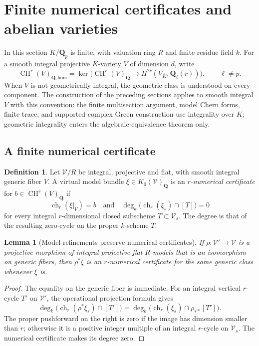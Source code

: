 \documentclass[11pt]{article}
\newtheorem{lemma}[theorem]{Lemma}
\theoremstyle{definition}
\newtheorem{definition}[theorem]{Definition}
\theoremstyle{remark}
\numberwithin{equation}{section}
\newcommand{\CH}{\operatorname{CH}}
\newcommand{\homol}{\mathrm{hom}}
\begin{document}
\section{Finite numerical certificates and abelian varieties}
\label{sec:abelian-numerical}

In this section $K/\mathbf Q_p$ is finite, with valuation ring $R$
and finite residue field $k$.  For a smooth integral projective
$K$-variety $V$ of dimension $d$, write
\[
 \CH^r(V)_{\mathbf Q,\homol}
 =\ker\bigl(\CH^r(V)_{\mathbf Q}\longrightarrow
          H^{2r}(V_{\overline K},\mathbf Q_\ell(r))\bigr),
 \qquad \ell\ne p.
\]
When $V$ is not geometrically integral, the geometric class is
understood on every component.  The construction of the preceding
sections applies to smooth integral $V$ with this convention: the
finite multisection argument, model Chern forms, finite trace, and
supported-complex Green construction use integrality over $K$;
geometric integrality enters the algebraic-equivalence theorem only.

\subsection{A finite numerical certificate}

\begin{definition}\label{def:numerical-certificate}
Let $\mathcal V/R$ be integral, projective and flat, with smooth
integral generic fiber $V$.  A virtual model bundle
$\xi\in K_0(\mathcal V)_{\mathbf Q}$ is an
\emph{$r$-numerical certificate} for
$b\in\CH^r(V)_{\mathbf Q}$ if
\[
  \operatorname{ch}_r(\xi|_V)=b
\quad\text{and}\quad
  \deg_k\bigl(\operatorname{ch}_r(\xi_s)\cap[T]\bigr)=0
\]
for every integral $r$-dimensional closed subscheme
$T\subset\mathcal V_s$.  The degree is that of the resulting
zero-cycle on the proper $k$-scheme $T$.
\end{definition}

\begin{lemma}[Model refinements preserve numerical certificates]
\label{lem:refine-certificate}
If $\rho:\mathcal V'\to\mathcal V$ is a projective morphism of
integral projective flat $R$-models that is an isomorphism on
generic fibers, then $\rho^*\xi$ is an $r$-numerical certificate
for the same generic class whenever $\xi$ is.
\end{lemma}

\begin{proof}
The equality on the generic fiber is immediate.  For an integral
vertical $r$-cycle $T'$ on $\mathcal V'$, the operational projection
formula gives
\[
 \deg_k\bigl(\operatorname{ch}_r(\rho^*\xi_s)\cap[T']\bigr)
 =\deg_k\bigl(\operatorname{ch}_r(\xi_s)\cap\rho_{s*}[T']\bigr).
\]
The proper pushforward on the right is zero if the image has
dimension smaller than $r$; otherwise it is a positive integer
multiple of an integral $r$-cycle on $\mathcal V_s$.  The numerical
certificate makes its degree zero.
\end{proof}
\end{document}
